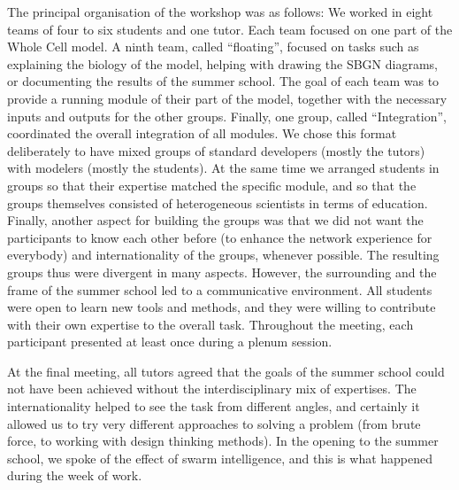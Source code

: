 \documentclass[journal,transmag]{IEEEtran}
\begin{document}
The principal organisation of the workshop was as follows: 
We worked in eight teams of four to six students and one tutor. 
Each team focused on one part of the Whole Cell model. 
A ninth team, called “floating”, focused on tasks such as explaining the biology of the model, helping with drawing the SBGN diagrams, or documenting the results of
the summer school. 
The goal of each team was to provide a running module of their part of the model, together with the necessary inputs and outputs for the other groups. 
Finally, one group, called “Integration”, coordinated the overall integration of all modules.
We chose this format deliberately to have mixed groups of standard developers (mostly the tutors) with modelers (mostly the students). 
At the same time we arranged students in groups so that their expertise matched the specific module, and so that the groups themselves consisted of heterogeneous scientists in terms of education. Finally, another aspect for building the groups was that we did not want the participants to know each other before (to enhance the network experience for everybody) and internationality of the groups, whenever possible. 
The resulting groups thus were divergent in many aspects. 
However, the surrounding and the frame of the summer school led to a communicative environment. 
All students were open to learn new tools and methods, and they were willing to contribute with their own expertise to the overall task.
Throughout the meeting, each participant presented at least once during a plenum session.

At the final meeting, all tutors agreed that the goals of the summer school could not have been achieved without the interdisciplinary mix of expertises. 
The internationality helped to see the task from different angles, and certainly it allowed us to try very different approaches to solving a problem (from brute force, to working with design thinking methods). 
In the opening to the summer school, we spoke of the effect of swarm intelligence, and this is what happened during the week of work.
\end{document}
